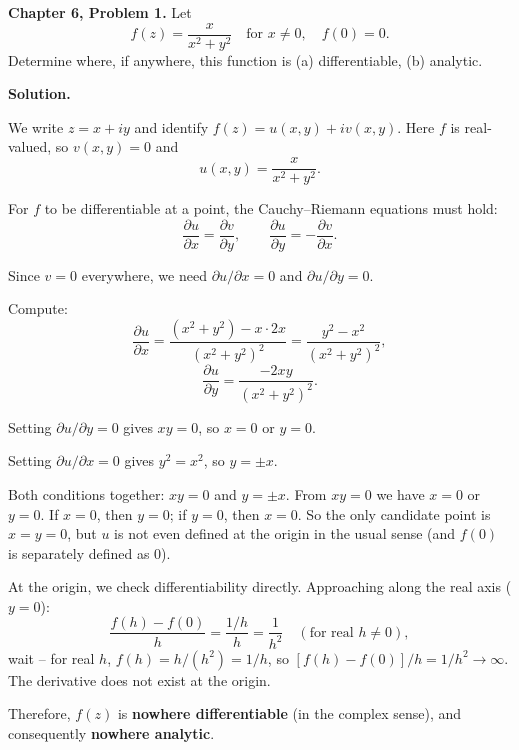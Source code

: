 \documentclass[12pt]{article}
\begin{document}
\textbf{Chapter 6, Problem 1.} Let
\[
f(z) = \frac{x}{x^2 + y^2} \quad \text{for } x \neq 0, \quad f(0) = 0.
\]
Determine where, if anywhere, this function is (a) differentiable, (b) analytic.

\bigskip
\textbf{Solution.}

We write $z = x + iy$ and identify $f(z) = u(x,y) + iv(x,y)$. Here $f$ is real-valued, so $v(x,y) = 0$ and
\[
u(x,y) = \frac{x}{x^2 + y^2}.
\]

For $f$ to be differentiable at a point, the Cauchy--Riemann equations must hold:
\[
\frac{\partial u}{\partial x} = \frac{\partial v}{\partial y}, \qquad \frac{\partial u}{\partial y} = -\frac{\partial v}{\partial x}.
\]

Since $v = 0$ everywhere, we need $\partial u/\partial x = 0$ and $\partial u/\partial y = 0$.

Compute:
\[
\frac{\partial u}{\partial x} = \frac{(x^2+y^2) - x \cdot 2x}{(x^2+y^2)^2} = \frac{y^2 - x^2}{(x^2+y^2)^2},
\]
\[
\frac{\partial u}{\partial y} = \frac{-2xy}{(x^2+y^2)^2}.
\]

Setting $\partial u/\partial y = 0$ gives $xy = 0$, so $x = 0$ or $y = 0$.

Setting $\partial u/\partial x = 0$ gives $y^2 = x^2$, so $y = \pm x$.

Both conditions together: $xy = 0$ and $y = \pm x$. From $xy = 0$ we have $x = 0$ or $y = 0$. If $x = 0$, then $y = 0$; if $y = 0$, then $x = 0$. So the only candidate point is $x = y = 0$, but $u$ is not even defined at the origin in the usual sense (and $f(0)$ is separately defined as 0).

At the origin, we check differentiability directly. Approaching along the real axis ($y = 0$):
\[
\frac{f(h) - f(0)}{h} = \frac{1/h}{h} = \frac{1}{h^2} \quad (\text{for real } h \neq 0),
\]
wait -- for real $h$, $f(h) = h/(h^2) = 1/h$, so $[f(h)-f(0)]/h = 1/h^2 \to \infty$. The derivative does not exist at the origin.

Therefore, $f(z)$ is \textbf{nowhere differentiable} (in the complex sense), and consequently \textbf{nowhere analytic}.
\end{document}

